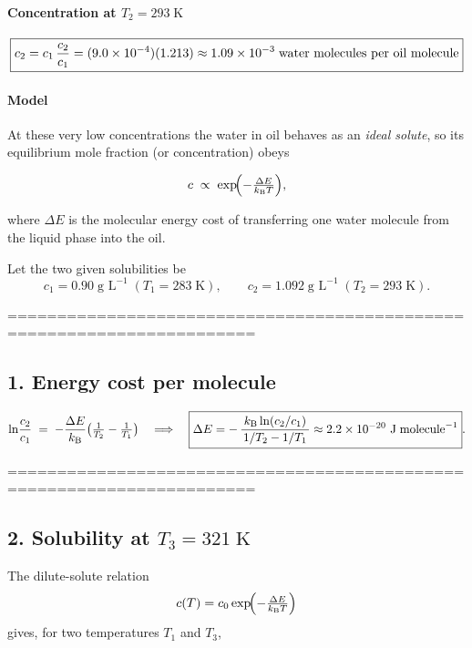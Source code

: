 \documentclass[12pt]{article}
\theoremstyle{definition} %
\theoremstyle{plain} %
\begin{document}
\paragraph{Concentration at \(T_2=293\;\text{K}\)}
\[
\boxed{%
  c_2 = c_1\,\frac{c_2}{c_1}
       =(9.0\times10^{-4})(1.213)
       \approx 1.09\times10^{-3}\;
       \text{water molecules per oil molecule}
}
\]
\paragraph{Model}  At these very low concentrations the water in oil
behaves as an \emph{ideal solute}, so its equilibrium mole fraction (or
concentration) obeys

\[
c \;\propto\; \exp\!\Bigl(-\tfrac{\Delta E}{k_{\mathrm B}T}\Bigr),
\]

where \(\Delta E\) is the molecular energy cost of transferring one
water molecule from the liquid phase into the oil.

Let the two given solubilities be
\[
  c_1 = 0.90\;\text{g L}^{-1}\;(T_1=283\;\text{K}),\qquad
  c_2 = 1.092\;\text{g L}^{-1}\;(T_2=293\;\text{K}).
\]

=======================================================================
\subsection*{1. Energy cost per molecule}

\[
  \ln\!\frac{c_2}{c_1}
  \;=\;
  -\frac{\Delta E}{k_{\mathrm B}}
  \bigl(\tfrac{1}{T_2}-\tfrac{1}{T_1}\bigr)
  \quad\Longrightarrow\quad
  \boxed{%
    \Delta E
    = -\,\frac{k_{\mathrm B}\ln(c_2/c_1)}{\,1/T_2 - 1/T_1\,}
    \approx 2.2\times10^{-20}\ \text{J\;molecule}^{-1}}.
\]

=======================================================================
\subsection*{2. Solubility at \(T_3 = 321\;\text{K}\)}

The dilute-solute relation  
\[
  c(T)=c_0\exp\!\Bigl(-\tfrac{\Delta E}{k_{\mathrm B}T}\Bigr)
\]
gives, for two temperatures \(T_1\) and \(T_3\),
\end{document}
